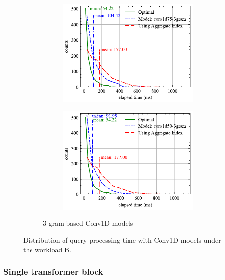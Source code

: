 \documentclass[conference]{IEEEtran}
\begin{document}
\begin{figure}[!h]
\begin{subfigure}{0.45\textwidth}
\begin{subfigure}{\textwidth}
			\includegraphics[]{graphics/perf_dist_conv1d75_3gram_B.pdf}
		\end{subfigure}
		\vfill
		\begin{subfigure}{\textwidth}
			\centering
			\includegraphics[]{graphics/perf_dist_conv1d50_3gram_B.pdf}
		\end{subfigure}
		\caption{3-gram based Conv1D models}
	\end{subfigure}
	\caption{Distribution of query processing time with Conv1D models under the workload B.}
	\label{fig:conv1d_perf_all_B}
\end{figure}

\subsubsection{Single transformer block}
\end{document}
